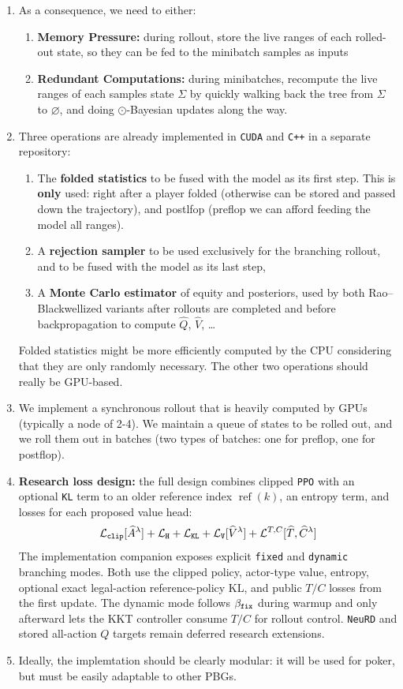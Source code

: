 \documentclass[12pt, a4paper]{article}
\begin{document}
\begin{enumerate}
  \item As a consequence, we need to either:
  \begin{enumerate}
    \item \textbf{Memory Pressure:} during rollout, store the live ranges of each rolled-out state, so they can be fed to the minibatch samples as inputs
    \item \textbf{Redundant Computations:} during minibatches, recompute the live ranges of each samples state $\Sigma$ by quickly walking back the tree from $\Sigma$ to $\varnothing$, and doing $\odot$-Bayesian updates along the way.
  \end{enumerate}

  \item Three operations are already implemented in \texttt{CUDA} and \texttt{C++} in a separate repository:
  \begin{enumerate}
    \item The \textbf{folded statistics} to be fused with the model as its first step.
    This is \textbf{only} used: right after a player folded (otherwise can be stored and passed down the trajectory), and postlfop (preflop we can afford feeding the model all ranges). 
    \item A \textbf{rejection sampler} to be used exclusively for the branching rollout, and to be fused with the model as its last step,
    \item A \textbf{Monte Carlo estimator} of equity and posteriors, used by both Rao--Blackwellized variants after rollouts are completed and before backpropagation to compute $\widehat{Q}$, $\widehat{V}$, \ldots
  \end{enumerate} 
  Folded statistics might be more efficiently computed by the CPU considering that they are only randomly necessary.
  The other two operations should really be GPU-based.

  \item We implement a synchronous rollout that is heavily computed by GPUs (typically a node of 2-4).
  We maintain a queue of states to be rolled out, and we roll them out in batches (two types of batches: one for preflop, one for postflop).

  \item \textbf{Research loss design:} the full design combines clipped \texttt{PPO} with an optional \texttt{KL} term to an older reference index $\operatorname{ref}(k)$, an entropy term, and losses for each proposed value head:
  \[
    \mathcal L_{\tt clip}[\widehat A^\lambda]+\mathcal L_{\tt H} + \mathcal L_{\tt KL} + \mathcal L_{\tt V}[\widehat V^\lambda] + \mathcal L^{T,C}[\widehat T,\widehat C^\lambda]
  \]
  The implementation companion exposes explicit \texttt{fixed} and
  \texttt{dynamic} branching modes. Both use the clipped policy, actor-type
  value, entropy, optional exact legal-action reference-policy KL, and public
  $T/C$ losses from the first update. The dynamic mode follows
  $\beta_{\tt fix}$ during warmup and only afterward lets the KKT controller
  consume $T/C$ for rollout control. \texttt{NeuRD} and stored all-action $Q$
  targets remain deferred research extensions.

  \item Ideally, the implemtation should be clearly modular: it will be used for poker, but must be easily adaptable to other PBGs.
\end{enumerate}
\end{document}
